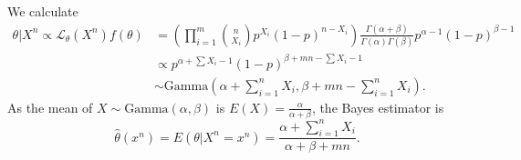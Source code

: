 \begin{itemize}
\begin{equation*}
    \end{equation*}
    We calculate
    \begin{equation*}
        \begin{split}
            \theta|X^n \propto \mathcal{L}_{\theta}(X^n) f(\theta)
                &= \left(\prod_{i = 1}^m \binom{n}{X_i} p^{X_i} (1 - p)^{n - X_i}\right) \frac{\Gamma(\alpha + \beta)}{\Gamma(\alpha)\Gamma(\beta)} p^{\alpha - 1}(1 - p)^{\beta - 1} \\
                &\propto p^{\alpha + \sum X_i - 1} (1 - p)^{\beta + mn - \sum X_i - 1} \\
                &\sim \mathrm{Gamma}\left(\alpha + \sum_{i = 1}^n X_i, \beta + mn - \sum_{i = 1}^n X_i\right).
        \end{split}
    \end{equation*}
    As the mean of $X \sim \mathrm{Gamma}(\alpha, \beta)$ is $E(X) = \frac{\alpha}{\alpha + \beta}$, the Bayes estimator is
    \begin{equation*}
        \hat{\theta}(x^n) = E(\theta|X^n = x^n) = \frac{\alpha + \sum_{i = 1}^n X_i}{\alpha + \beta + mn}.
    \end{equation*}
\end{itemize}
